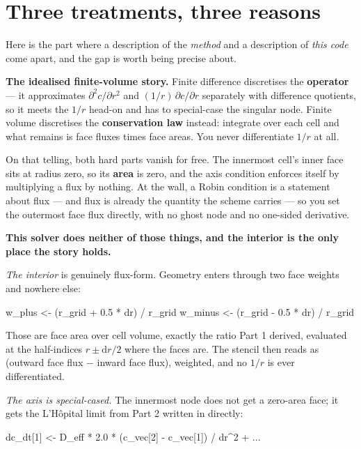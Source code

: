 \documentclass[11pt]{article}
\begin{document}
\section{Three treatments, three reasons}

Here is the part where a description of the \emph{method} and a description of \emph{this
code} come apart, and the gap is worth being precise about.

\textbf{The idealised finite-volume story.} Finite difference discretises the
\textbf{operator} — it approximates $\partial^2 c/\partial r^2$ and
$(1/r)\,\partial c/\partial r$ separately with difference quotients, so it meets the $1/r$
head-on and has to special-case the singular node. Finite volume discretises the
\textbf{conservation law} instead: integrate over each cell and what remains is face fluxes
times face areas. You never differentiate $1/r$ at all.

On that telling, both hard parts vanish for free. The innermost cell's inner face sits at
radius zero, so its \textbf{area} is zero, and the axis condition enforces itself by
multiplying a flux by nothing. At the wall, a Robin condition is a statement about flux — and
flux is already the quantity the scheme carries — so you set the outermost face flux
directly, with no ghost node and no one-sided derivative.

\textbf{This solver does neither of those things, and the interior is the only place the
story holds.}

\emph{The interior} is genuinely flux-form. Geometry enters through two face weights and
nowhere else:

\begin{code}
w_plus  <- (r_grid + 0.5 * dr) / r_grid
w_minus <- (r_grid - 0.5 * dr) / r_grid
\end{code}

Those are face area over cell volume, exactly the ratio Part 1 derived, evaluated at the
half-indices $r \pm \mathrm{d}r/2$ where the faces are. The stencil then reads as (outward
face flux $-$ inward face flux), weighted, and no $1/r$ is ever differentiated.

\emph{The axis is special-cased.} The innermost node does not get a zero-area face; it gets
the L'Hôpital limit from Part 2 written in directly:

\begin{code}
dc_dt[1] <- D_eff * 2.0 * (c_vec[2] - c_vec[1]) / dr^2 + ...
\end{code}
\end{document}
